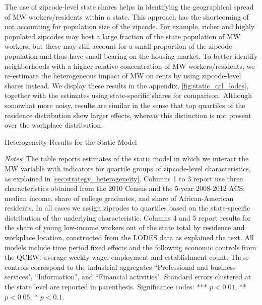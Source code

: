 The use of zipcode-level state shares helps in identifying the geographical spread of MW 
workers/residents within a state. This approach has the shortcoming of not accounting for 
population size of the zipcode. For example, richer and highly populated zipcodes may host a large 
fraction of the state population of MW workers, but these may still account for a small proportion 
of the zipcode population and thus have small bearing on the housing market. To better identify 
neighborhoods with a higher relative concentration of MW workers/residents, we re-estimate the 
heterogeneous impact of MW on rents by using zipcode-level shares instead. We display these results 
in the appendix, \autoref{fig:static_qtl_lodes}, together with the estimates using state-specific 
shares for comparison. Although somewhat more noisy, results are similar in the sense that top 
quartiles of the residence distribution show larger effects, whereas this distinction is not 
present over the workplace distribution.

\begin{table}[h!]
    \caption{Heterogeneity Results for the Static Model}
    \label{tab:fd_model_het}
    \centering
    
    \begin{minipage}{0.95\textwidth} \footnotesize
		\vspace{3mm}
		\textit{Notes}: The table reports estimates of the static model in which we interact the 
		MW variable with indicators for quartile groups of zipcode-level characteristics, as explained
		in \autoref{sec:strategy_heterogeneity}. Columns 1 to 3 report use three characteristics 
		obtained from the 2010 Census and the 5-year 2008-2012 ACS: median income, share of college
		graduates, and share of African-American residents. In all cases we assign zipcodes to quartiles 
		based on the state-specific distribution of the underlying characteristic. Columns 4 and 5 
		report results for the share of young low-income workers out of the state total by residence
		and workplace location, constructed from the LODES data as explained the text. All models
		include time period fixed effects and the following economic controls from the QCEW: average
		weekly wage, employment and establishment count. These controls correspond to the industrial 
		aggregates ``Professional and business services", ``Information", and ``Financial activities".
		Standard errors clustered at the state level are reported in parenthesis. Significance codes: 
		*** $p < 0.01$, ** $p < 0.05$, * $p < 0.1$.
	\end{minipage}
\end{table}
